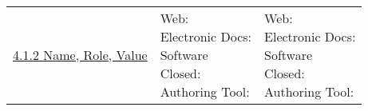 \documentclass[a4paper]{report}
\begin{document}
\begin{longtable}{|l|l|l|}
 	\hline
 	\href{http://www.w3.org/TR/WCAG20/#ensure-compat-rsv}{4.1.2 Name, Role, Value} & \makecell{Web: \\ Electronic Docs: \\ Software \\ Closed: \\ Authoring Tool:} & \makecell{Web: \\ Electronic Docs: \\ Software \\ Closed: \\ Authoring Tool:}
 	\hline
 	\end{longtable}
\end{document}
